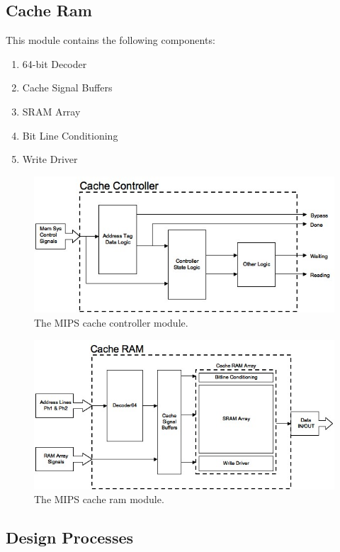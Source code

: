 \documentclass[a4paper,12pt]{article}
\begin{document}
\subsection{Cache Ram}

This module contains the following components:
\begin{enumerate}
\item 64-bit Decoder
\item Cache Signal Buffers
\item SRAM Array
\item Bit Line Conditioning
\item Write Driver
\end{enumerate}

\begin{figure}
\centering 
\includegraphics[width=\textwidth]{cachecontroller}
\caption{The MIPS cache controller module.}
\label{cachecontroller}
\end{figure}

\begin{figure}
\centering 
\includegraphics[width=\textwidth]{cacheram}
\caption{The MIPS cache ram module.}
\label{cacheram}
\end{figure}

\subsection{Design Processes}
\end{document}
